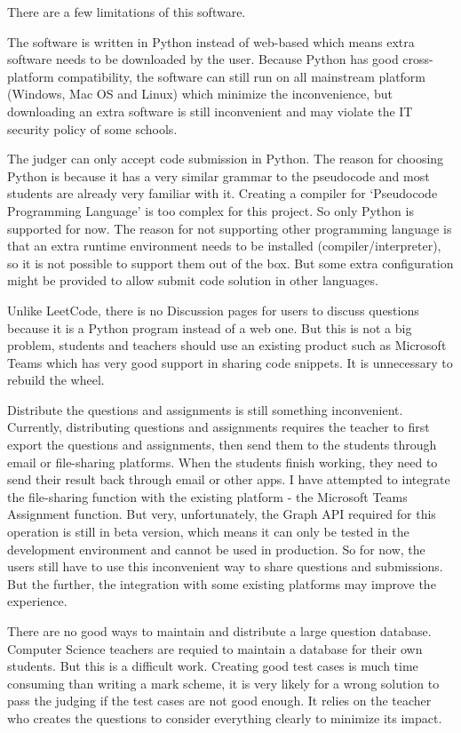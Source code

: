 \documentclass{report}
\begin{document}
There are a few limitations of this software.

The software is written in Python instead of web-based which means extra software needs to be downloaded by the user. Because Python has good cross-platform compatibility, the software can still run on all mainstream platform (Windows, Mac OS and Linux) which minimize the inconvenience, but downloading an extra software is still inconvenient and may violate the IT security policy of some schools.

The judger can only accept code submission in Python. The reason for choosing Python is because it has a very similar grammar to the pseudocode and most students are already very familiar with it. Creating a compiler for `Pseudocode Programming Language' is too complex for this project. So only Python is supported for now. The reason for not supporting other programming language is that an extra runtime environment needs to be installed (compiler/interpreter), so it is not possible to support them out of the box. But some extra configuration might be provided to allow submit code solution in other languages.

Unlike LeetCode, there is no Discussion pages for users to discuss questions because it is a Python program instead of a web one. But this is not a big problem, students and teachers should use an existing product such as Microsoft Teams which has very good support in sharing code snippets. It is unnecessary to rebuild the wheel.

Distribute the questions and assignments is still something inconvenient. Currently, distributing questions and assignments requires the teacher to first export the questions and assignments, then send them to the students through email or file-sharing platforms. When the students finish working, they need to send their result back through email or other apps. I have attempted to integrate the file-sharing function with the existing platform - the Microsoft Teams Assignment function. But very, unfortunately, the Graph API required for this operation is still in beta version, which means it can only be tested in the development environment and cannot be used in production. So for now, the users still have to use this inconvenient way to share questions and submissions. But the further, the integration with some existing platforms may improve the experience.

There are no good ways to maintain and distribute a large question database. Computer Science teachers are requied to maintain a database for their own students. But this is a difficult work. Creating good test cases is much time consuming than writing a mark scheme, it is very likely for a wrong solution to pass the judging if the test cases are not good enough. It relies on the teacher who creates the questions to consider everything clearly to minimize its impact.
\end{document}
